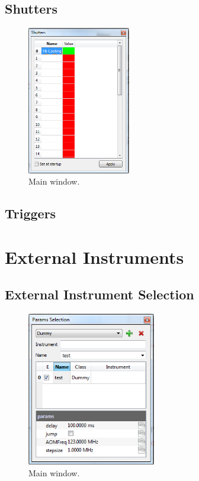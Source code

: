 \documentclass{scrartcl}
\begin{document}
\subsection{Shutters}
\begin{figure}[htbp]
\begin{center}
\includegraphics[width=0.4\textwidth]{Shutters}
\end{center}
\caption{\label{Shutters} Main window.}
\end{figure}

\subsection{Triggers}

\section{External Instruments}
\subsection{External Instrument Selection}
\begin{figure}[htbp]
\begin{center}
\includegraphics[width=0.5\textwidth]{ParamsSelection}
\end{center}
\caption{\label{ParamsSelection} Main window.}
\end{figure}
\end{document}
